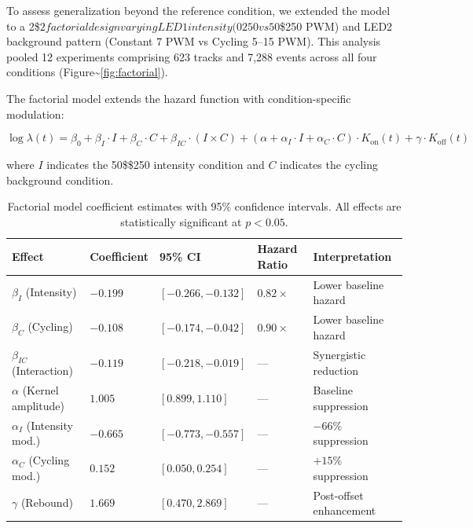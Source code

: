 \documentclass[
  11pt,
  letterpaper,
]{article}
\begin{document}
To assess generalization beyond the reference condition, we extended the
model to a
2\$\times\(2 factorial design varying LED1 intensity (0\)\rightarrow\(250 vs 50\)\rightarrow\$250
PWM) and LED2 background pattern (Constant 7 PWM vs Cycling 5--15 PWM).
This analysis pooled 12 experiments comprising 623 tracks and 7,288
events across all four conditions
(Figure\textasciitilde{}\ref{fig:factorial}).

The factorial model extends the hazard function with condition-specific
modulation:

\begin{equation}
\log \lambda(t) = \beta_0 + \beta_I \cdot I + \beta_C \cdot C + \beta_{IC} \cdot (I \times C) + (\alpha + \alpha_I \cdot I + \alpha_C \cdot C) \cdot K_{\text{on}}(t) + \gamma \cdot K_{\text{off}}(t)
\label{eq:factorial}
\end{equation}

\noindent where \(I\) indicates the 50\$\rightarrow\$250 intensity
condition and \(C\) indicates the cycling background condition.

\begin{table}[h]
\centering
\caption{Factorial model coefficient estimates with 95\% confidence intervals. All effects are statistically significant at $p < 0.05$.}
\label{tab:factorial}
\begin{tabular}{lllll}
\hline
\textbf{Effect} & \textbf{Coefficient} & \textbf{95\% CI} & \textbf{Hazard Ratio} & \textbf{Interpretation} \\
\hline
$\beta_I$ (Intensity) & $-0.199$ & $[-0.266, -0.132]$ & $0.82\times$ & Lower baseline hazard \\
$\beta_C$ (Cycling) & $-0.108$ & $[-0.174, -0.042]$ & $0.90\times$ & Lower baseline hazard \\
$\beta_{IC}$ (Interaction) & $-0.119$ & $[-0.218, -0.019]$ & --- & Synergistic reduction \\
$\alpha$ (Kernel amplitude) & $1.005$ & $[0.899, 1.110]$ & --- & Baseline suppression \\
$\alpha_I$ (Intensity mod.) & $-0.665$ & $[-0.773, -0.557]$ & --- & $-66\%$ suppression \\
$\alpha_C$ (Cycling mod.) & $0.152$ & $[0.050, 0.254]$ & --- & $+15\%$ suppression \\
$\gamma$ (Rebound) & $1.669$ & $[0.470, 2.869]$ & --- & Post-offset enhancement \\
\hline
\end{tabular}
\end{table}
\end{document}
